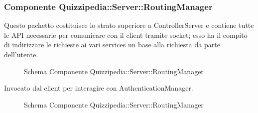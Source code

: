 \subsubsection{Componente Quizzipedia::Server::RoutingManager}
Questo pachetto costituisce lo strato superiore a ControllerServer e contiene tutte le API necessarie per comunicare con il client tramite socket; esso ha il compito di indirizzare le richieste ai vari services un base alla richiesta da parte dell'utente.
\begin{figure}[H]
\centering
\noindent{}
\caption{Schema Componente Quizzipedia::Server::RoutingManager}
\end{figure}
Invocato dal client per interagire con AuthenticationManager.
\begin{figure}[H]
\centering
\noindent{}
\caption{Schema Componente Quizzipedia::Server::RoutingManager}
\end{figure}
